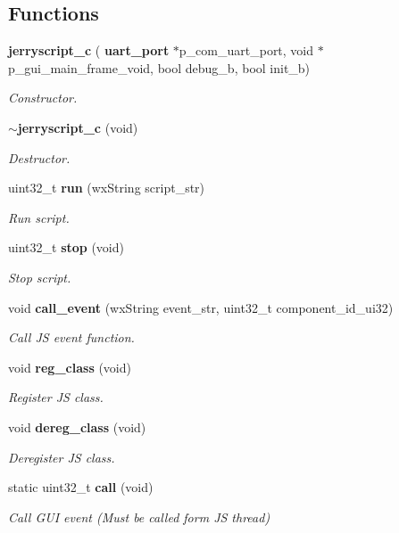 \subsection*{Functions}
\begin{DoxyCompactItemize}
\item 
\textbf{ jerryscript\+\_\+c} (\textbf{ uart\+\_\+port} $\ast$p\+\_\+com\+\_\+uart\+\_\+port, void $\ast$p\+\_\+gui\+\_\+main\+\_\+frame\+\_\+void, bool debug\+\_\+b, bool init\+\_\+b)
\begin{DoxyCompactList}\small\item\em Constructor. \end{DoxyCompactList}\item 
\textbf{ $\sim$jerryscript\+\_\+c} (void)
\begin{DoxyCompactList}\small\item\em Destructor. \end{DoxyCompactList}\item 
uint32\+\_\+t \textbf{ run} (wx\+String script\+\_\+str)
\begin{DoxyCompactList}\small\item\em Run script. \end{DoxyCompactList}\item 
uint32\+\_\+t \textbf{ stop} (void)
\begin{DoxyCompactList}\small\item\em Stop script. \end{DoxyCompactList}\item 
void \textbf{ call\+\_\+event} (wx\+String event\+\_\+str, uint32\+\_\+t component\+\_\+id\+\_\+ui32)
\begin{DoxyCompactList}\small\item\em Call JS event function. \end{DoxyCompactList}\item 
void \textbf{ reg\+\_\+class} (void)
\begin{DoxyCompactList}\small\item\em Register JS class. \end{DoxyCompactList}\item 
void \textbf{ dereg\+\_\+class} (void)
\begin{DoxyCompactList}\small\item\em Deregister JS class. \end{DoxyCompactList}\item 
static uint32\+\_\+t \textbf{ call} (void)
\begin{DoxyCompactList}\small\item\em Call G\+UI event (Must be called form JS thread) \end{DoxyCompactList}\end{DoxyCompactItemize}
